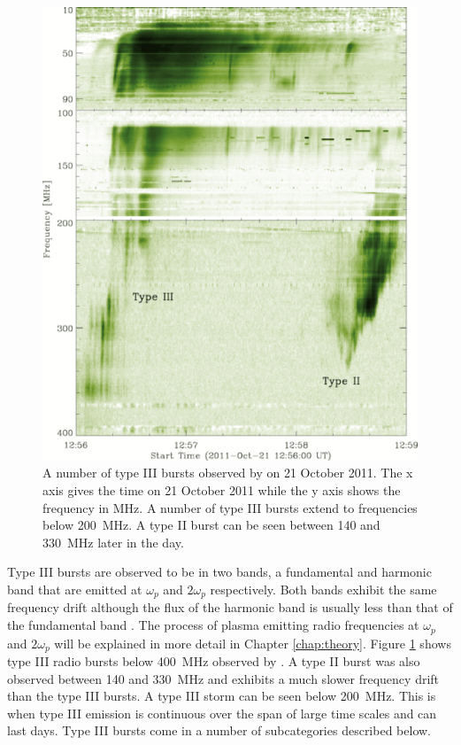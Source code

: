 \begin{figure}
    \centering
    \includegraphics[width=0.75\columnwidth]{Images/Pietro_typeIII.png}
    \caption[A number of type III bursts observed by \cite{Zucca2012} on 21 October 2011.]{A number of type III bursts observed by \cite{Zucca2012} on 21 October 2011. The x axis gives the time on 21 October 2011 while the y axis shows the frequency in MHz. A number of type III bursts extend to frequencies below 200~MHz. A type II burst can be seen between 140 and 330~MHz later in the day.}
    \label{fig:bursts}
\end{figure}

Type III bursts are observed to be in two bands, a fundamental and harmonic band that are emitted at $\omega_p$ and $2 \omega_p$ respectively. Both bands exhibit the same frequency drift although the flux of the harmonic band is usually less than that of the fundamental band \citep{Wild1954a, McLean1985}. The process of plasma emitting radio frequencies at $\omega_p$ and $2 \omega_p$ will be explained in more detail in Chapter \ref{chap:theory}. 
Figure \ref{fig:bursts} shows type III radio bursts below 400~MHz observed by \cite{Zucca2012}. A type II burst was also observed between 140 and 330~MHz and exhibits a much slower frequency drift than the type III bursts. A type III storm can be seen below 200~MHz. This is when type III emission is continuous over the span of large time scales and can last days. Type III bursts come in a number of subcategories described below.

